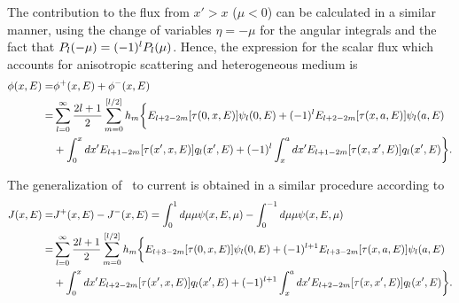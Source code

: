 The contribution to the flux from $x'>x$ ($\mu<0$) can be calculated in a similar manner, using the change of variables $\eta=-\mu$ for the angular integrals and the fact that $P_l(-\mu)=(-1)^lP_l(\mu)$. Hence, the expression for the scalar flux which accounts for anisotropic scattering and heterogeneous medium is
\begin{equation}\label{eq:int-scalar-flux}
\begin{split}
\phi(x,E) =& \phi^+(x,E)+\phi^-(x,E) \\
=& \sum\limits_{l=0}^\infty  \frac{2l+1}{2} 
\sum\limits_{m=0}^{[l/2]} h_m
\bigg\{
E_{l+2-2m}[\tau(0,x,E)]	\psi_l(0,E) 
+(-1)^l E_{l+2-2m}[\tau(x,a,E)] \psi_l(a,E) \\
&+ \int_0^x dx' E_{l+1-2m}[\tau(x',x,E)] q_l(x',E)
      +(-1)^l \int_x^a dx' 
      E_{l+1-2m}[\tau(x,x',E)] q_l(x',E)
\bigg\}.
\end{split}
\end{equation}

%
The generalization of~ to current is obtained in a similar procedure according to
\begin{equation}\label{eq:tot-J}
\begin{split}
J(x,E) =& J^+(x,E) - J^-(x,E) = \int_0^1 {d\mu \mu \psi(x,E,\mu)} 
- \int_0^{-1} {d\mu \mu \psi(x,E,\mu)} \\
=&\sum\limits_{l=0}^\infty  \frac{2l+1}{2}
\sum\limits_{m=0}^{[l/2]}  h_m
\bigg\{
E_{l+3-2m}[\tau(0,x,E)]	\psi_l(0,E) 
+(-1)^{l+1} E_{l+3-2m}[\tau(x,a,E)]\psi_l(a,E) \\
&+
\int_0^x dx' E_{l+2-2m}[\tau(x',x,E)] q_l(x',E)
+(-1)^{l+1} \int_x^a dx' E_{l+2-2m}[\tau(x,x',E)] q_l(x',E)
\bigg\}.
\end{split}
\end{equation}
%
%

